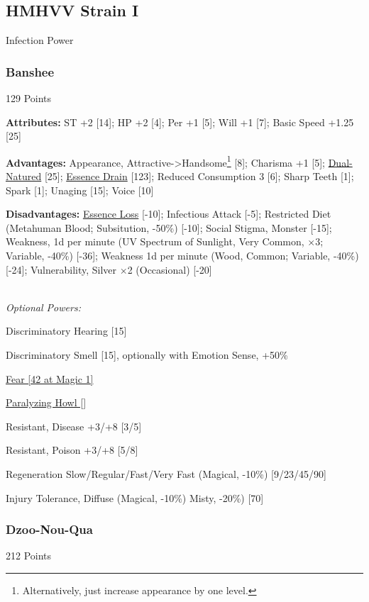 \begin{multicols*}{3}
	
	\subsection*{HMHVV Strain I}
	
	Infection Power
	
	\subsubsection{Banshee}\label{banshee}
	\begin{flushright}
		129 Points
	\end{flushright}
	
	\textbf{Attributes:}
	ST +2 [14]; HP +2 [4]; Per +1 [5]; Will +1 [7]; Basic Speed +1.25 [25]
	
	\textbf{Advantages:}
	Appearance, Attractive->Handsome\footnote{Alternatively, just increase appearance by one level.} [8]; Charisma +1 [5]; \hyperref[dual_natured]{Dual-Natured} [25]; \hyperref[essence_drain]{Essence Drain} [123]; Reduced Consumption 3 [6]; Sharp Teeth [1]; Spark [1]; Unaging [15]; Voice [10]
	
	\textbf{Disadvantages:}	
	\hyperref[essence_loss]{Essence Loss} [-10]; Infectious Attack [-5]; Restricted Diet (Metahuman Blood; Subsitution, -50\%) [-10]; Social Stigma, Monster [-15]; Weakness, 1d per minute (UV Spectrum of Sunlight, Very Common, $\times$3; Variable, -40\%) [-36]; Weakness 1d per minute (Wood, Common; Variable, -40\%) [-24]; Vulnerability, Silver $\times$2 (Occasional) [-20]
	
	\textit{\\Optional Powers:}
	
	Discriminatory Hearing [15]
	
	Discriminatory Smell [15], optionally with Emotion Sense, +50\%
	
	\hyperref[fear]{Fear [42 at Magic 1]}
	
	\hyperref[paralyzing_howl]{Paralyzing Howl []}
	
	Resistant, Disease +3/+8 [3/5]
	
	Resistant, Poison +3/+8 [5/8]
	
	Regeneration Slow/Regular/Fast/Very Fast (Magical, -10\%) [9/23/45/90]
	
	Injury Tolerance, Diffuse (Magical, -10\%) Misty, -20\%) [70]
	
	\subsubsection{Dzoo-Nou-Qua}\label{dzoo-noo-qua}
	\begin{flushright}
		212 Points
	\end{flushright}
	

\end{multicols*}

